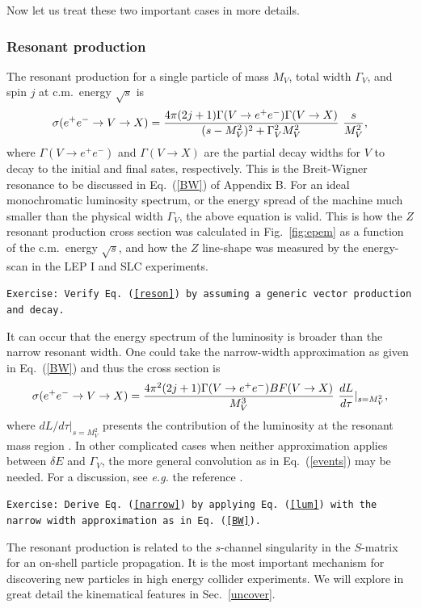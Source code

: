 \documentclass[12pt,prd,aps,floats,preprintnumbers,preprint,superscriptaddress,floatfix,nofootinbib]{revtex4}
\def\epem{e^+e^-}
\def\bea{\begin{eqnarray}}
\def\eea{\end{eqnarray}}
\begin{document}
Now let us treat these two important cases in more details.

\subsubsection{Resonant production}
The resonant production for a single particle of mass $M_V$, total width $\Gamma_V$, 
and spin $j$ at c.m.~energy $\sqrt s$ is 
\bea
\sigma(e^+e^-\to V \to X) 
= \frac{4\pi(2j+1)\Gamma(V\to \epem)\Gamma(V\to X)} 
{(s-M^2_V)^2 + \Gamma_V^2 M_V^2} \ {s\over M_V^2},
\label{reson}
\eea 
where $\Gamma(V\to \epem)$ and $\Gamma(V\to X)$ are the partial decay widths
for $V$ to decay to the initial and final sates, respectively. 
This is the Breit-Wigner resonance to be discussed in Eq.~(\ref{BW}) of 
Appendix B. 
For an ideal monochromatic luminosity spectrum,
or the energy spread of the machine much smaller than the physical width $\Gamma_V$,
the above equation is valid.  This  is how the $Z$ 
resonant production cross section was calculated in Fig.~\ref{fig:epem}
as a function of the c.m.~energy $\sqrt s$, and
how the $Z$ line-shape was measured by the energy-scan 
in the LEP I and SLC experiments. 

{
\vskip 0.2cm
\noindent
\tt Exercise: Verify Eq.~(\ref{reson}) by assuming a generic vector production and decay.
\vskip 0.2cm
}

It can occur that the energy spectrum of the luminosity is broader than the narrow
resonant width. One could take the narrow-width approximation as given in
Eq.~(\ref{BW}) and thus the cross section is 
\bea
\sigma(e^+e^-\to V \to X) 
= \frac{4\pi^2 (2j+1)\Gamma(V\to \epem) BF(V\to X)} { M_V^3} \ 
{dL\over d\tau}|_{s=M_V^2},
\label{narrow}
\eea 
where $dL/ d\tau|_{s=M_V^2}$ presents the  contribution
of the luminosity at the resonant mass region . 
In other complicated cases when neither approximation applies between
$\delta E$ and $\Gamma_V$, the more general convolution 
as in Eq.~(\ref{events})
may be needed. For a discussion, see {\it e.g.} the reference \cite{muon}.

{
\vskip 0.2cm
\noindent
\tt Exercise: Derive Eq.~(\ref{narrow}) by applying Eq.~(\ref{lum}) with the narrow 
 width approximation as in Eq.~(\ref{BW}).
\vskip 0.2cm
}

The resonant production is related to the $s$-channel singularity in the 
$S$-matrix for an on-shell  particle propagation. 
It is the most important mechanism for discovering
new particles in high energy collider experiments. We will explore in
great detail the kinematical features in Sec.~\ref{uncover}.
\end{document}
